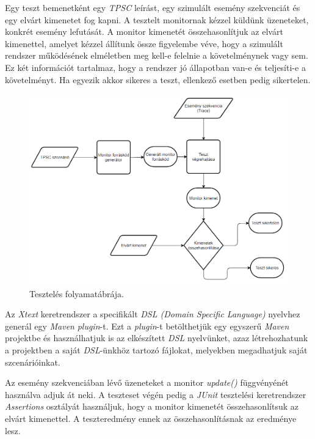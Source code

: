 Egy teszt bemenetként egy \textit{TPSC} leírást, egy szimulált esemény szekvenciát és egy elvárt kimenetet fog kapni.
A tesztelt monitornak kézzel küldünk üzeneteket, konkrét esemény lefutását.
A monitor kimenetét összehasonlítjuk az elvárt kimenettel, amelyet kézzel állítunk össze figyelembe véve, hogy a szimulált rendszer működésének elméletben meg kell-e felelnie a követelménynek vagy sem.
Ez két információt tartalmaz, hogy a rendszer jó állapotban van-e és teljesíti-e a követelményt.
Ha egyezik akkor sikeres a teszt, ellenkező esetben pedig sikertelen.

\begin{figure}[!ht]
    \centering
    \includegraphics[width=160mm, keepaspectratio]{figures/test_flowchart.png}
    \caption{Tesztelés folyamatábrája.}
    \label{testing_figure}
\end{figure}

Az \textit{Xtext} keretrendszer a specifikált \textit{DSL (Domain Specific Language)} nyelvhez generál egy \textit{Maven} \cite{Maven} \textit{plugin}-t.
Ezt a \textit{plugin}-t betölthetjük egy egyszerű \textit{Maven} projektbe és használhatjuk is az elkészített \textit{DSL} nyelvünket, azaz létrehozhatunk a projektben a saját \textit{DSL}-ünkhöz tartozó fájlokat, melyekben megadhatjuk saját szcenárióinkat.

Az esemény szekvenciában lévő üzeneteket a monitor \textit{update()} függvényénét használva adjuk át neki.
A teszteset végén pedig a \textit{JUnit} tesztelési keretrendszer \textit{Assertions} osztályát használjuk, hogy a monitor kimenetét összehasonlítsuk az elvárt kimenettel.
A teszteredmény ennek az összehasonlításnak az eredménye lesz.

